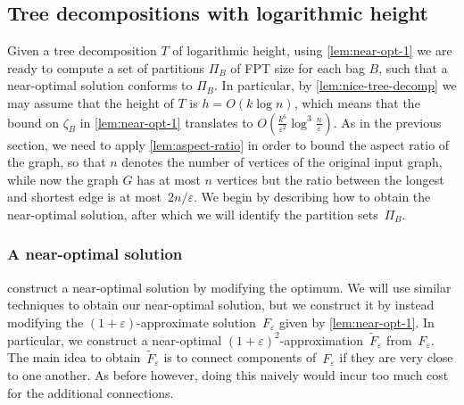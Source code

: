 \documentclass[a4paper]{article}
\let\oldcitet\citet
\renewcommand{\citet}[1]{\mbox{\oldcitet{#1}}}
\theoremstyle{plain}
\newtheorem{lemma}[theorem]{Lemma}%
\newcommand{\eps}{{\varepsilon}}
\DeclareMathOperator{\dist}{dist}
\DeclareMathOperator{\diam}{diam}
\begin{document}

\subsection{Tree decompositions with logarithmic height}
\label{sec:tw-log-height}

Given a tree decomposition $T$ of logarithmic height, using \autoref{lem:near-opt-1} we are ready to compute a set of partitions $\Pi_B$ of FPT size for each bag $B$, such that a near-optimal solution conforms to $\Pi_B$. In particular, by \autoref{lem:nice-tree-decomp} we may assume that the height of $T$ is $h=O(k\log n)$, which means that the bound on $\zeta_B$ in \autoref{lem:near-opt-1} translates to $O(\frac{k^6}{\eps^2}\log^3\frac{n}{\eps})$.
As in the previous section, we need to apply \autoref{lem:aspect-ratio} in order to bound the aspect ratio of the graph, so that $n$ denotes the number of vertices of the original input graph, while now the graph $G$ has at most $n$ vertices but the ratio between the longest and shortest edge is at most~$2n/\eps$.
We begin by describing how to obtain the near-optimal solution, after which we will identify the partition sets~$\Pi_B$.

\subsubsection{A near-optimal solution}
\label{sec:approx-sol}

\citet{bateni2011approximation} construct a near-optimal solution by modifying the optimum. 
We will use similar techniques to obtain our near-optimal solution, but we construct it by instead modifying the $(1+\eps)$-approx\-imate solution~$F_\eps$ given by \autoref{lem:near-opt-1}.
In particular, we construct a near-optimal $(1+\eps)^2$-approximation~$\widetilde{F}_\eps$ from~$F_\eps$.
The main idea to obtain~$\widetilde{F}_\eps$ is to connect components of~$F_\eps$ if they are very close to one another. 
As before however, doing this naively would incur too much cost for the additional connections.
\end{document}
